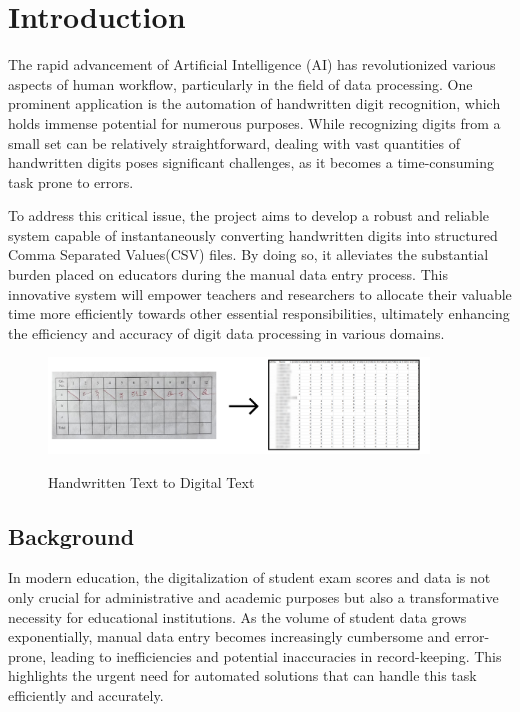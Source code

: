 \setcounter{equation}{0}

\chapter{Introduction}

\noindent The rapid advancement of Artificial Intelligence (AI) has revolutionized various aspects of human workflow, particularly in the field of data processing. One prominent application is the automation of handwritten digit recognition, which holds immense potential for numerous purposes. While recognizing digits from a small set can be relatively straightforward, dealing with vast quantities of handwritten digits poses significant challenges, as it becomes a time-consuming task prone to errors.

\noindent To address this critical issue, the project aims to develop a robust and reliable system capable of instantaneously converting handwritten digits into structured Comma Separated Values(CSV) files. By doing so, it alleviates the substantial burden placed on educators during the manual data entry process. This innovative system will empower teachers and researchers to allocate their valuable time more efficiently towards other essential responsibilities, ultimately enhancing the efficiency and accuracy of digit data processing in various domains.

\begin{figure}[h!]
    \centering
{\includegraphics[width=0.9\textwidth]{Images/Intro/intro_pic.jpg}}
  \caption{Handwritten Text to Digital Text}
\end{figure}

\clearpage

\section{Background}

\noindent In modern education, the digitalization of student exam scores and data is not only crucial for administrative and academic purposes but also a transformative necessity for educational institutions. As the volume of student data grows exponentially, manual data entry becomes increasingly cumbersome and error-prone, leading to inefficiencies and potential inaccuracies in record-keeping. This highlights the urgent need for automated solutions that can handle this task efficiently and accurately.

